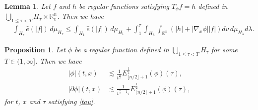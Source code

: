 \documentclass[10pt,a4paper]{amsart}
\newtheorem{lemma}{Lemma}
\newtheorem{proposition}{Proposition}
\newcommand{\bbr}{{\mathbb R}}
\newcommand{\bbrn}{{\bbr^n}}
\begin{document}
\begin{lemma} \label{lem intchif}
Let $ f $ and $ h $ be regular functions satisfying $ T_\phi f = h $ defined in $ \bigcup_{ 1 \leq \tau < T } H_\tau \times \bbr^n_v $. Then we have
\begin{align*}
& \int_{ H_\tau } \hat{ e } ( | f |) \, d \mu_{ H_\tau } \leq \int_{ H_1 } \hat{ e } ( | f | ) \, d \mu_{ H_1 } + \int_1^\tau \int_{ H_\lambda } \int_\bbrn \left( | h | + | \nabla_x \phi | | f | \right) d v \, d \mu_{ H_\lambda } d \lambda .
\end{align*}
\end{lemma}

\begin{proposition} \label{prop KSphi}
Let $ \phi $ be a regular function defined in $ \bigcup_{ 1 \leq \tau < T } H_\tau $ for some $ T \in ( 1 , \infty ] $. Then we have
\begin{align}
| \phi | ( t , x ) & \lesssim \frac{ 1 }{ t^\frac{ n }{ 2 } } E_{ \lfloor n / 2 \rfloor +1 }^{ \frac12 } ( \phi ) ( \tau ) , \label{KSphi} \\
| \partial \phi | ( t , x ) & \lesssim \frac{ 1 }{ t^{ \frac{ n }{ 2 } - 1 } \tau } E_{ \lfloor n / 2 \rfloor +1 }^{ \frac12 } ( \phi ) ( \tau ) , \label{KSphiimprove}
\end{align}
for $ t $, $ x $ and $ \tau $ satisfying \eqref{tau}.
\end{proposition}
\end{document}
